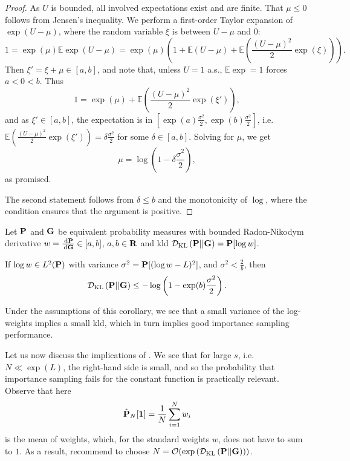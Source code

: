 \begin{proof}
    As $U$ is bounded, all involved expectations exist and are finite. That $\mu \leq 0$ follows from Jensen's inequality. We perform a first-order Taylor expansion of $\exp(U - \mu)$, where the random variable $\xi$ is between $U - \mu$ and $0$:
    $$
    1 = \exp(\mu)\mathbb E \exp (U - \mu) = \exp (\mu) \left( 1 + \mathbb E (U - \mu) + \mathbb E\left(\frac{(U-\mu)^{2}}{2} \exp(\xi)\right) \right).
    $$
    Then $\xi' = \xi + \mu \in [a,b]$, and note that, unless $U = 1$ a.s., $\mathbb E \exp = 1$ forces $a < 0 < b$. 
    Thus
    $$
    1 = \exp(\mu) + \mathbb E\left(\frac{(U-\mu)^{2}}{2} \exp(\xi')\right),
    $$
    and as $\xi' \in [a,b]$, the expectation is in $\left[\exp(a) \frac{\sigma^{2}}{2}, \exp(b) \frac{\sigma^{2}}{2}\right]$, i.e. $\mathbb E\left(\frac{(U-\mu)^{2}}{2} \exp(\xi')\right) = \delta \frac{\sigma^{2}}{2}$ for some $\delta \in [a,b]$. Solving for $\mu$, we get 
    $$
    \mu = \log \left( 1 - \delta \frac{\sigma^{2}}{2} \right),
    $$
    as promised.

    The second statement follows from $\delta \leq b$ and the monotonicity of $\log$, where the condition ensures that the argument is positive.
\end{proof}

\begin{corollary}
    Let $\P$ and $\G$ be equivalent probability measures with bounded Radon-Nikodym derivative $w = \frac{\d\P}{\d\G} \in [a,b]$, $a, b \in \R$ and \acrshort{kld} $\Dkl{\P}{\G} =\P [\log w]$.
    
    If $\log w \in L^{2}(\P)$ with variance $\sigma^{2} = \P [(\log w - L)^2]$, and $\sigma^{2} < \frac{2}{b}$, then 
    $$
    \Dkl{\P}{\G} \leq - \log \left(1 - \exp(b) \frac{\sigma^{2}}{2} \right).
    $$
\end{corollary}
Under the assumptions of this corollary, we see that a small variance of the log-weights implies a small \acrshort{kld}, which in turn implies good importance sampling performance.

Let us now discuss the implications of . We see that for large $s$, i.e. $N \ll \exp(L)$, the right-hand side is small, and so the probability that importance sampling fails for the constant function is practically relevant. Observe that here 
$$
\hat \P_{N} [\mathbf 1 ] = \frac{1}{N} \sum_{i = 1}^N w_{i}
$$
is the mean of weights, which, for the standard weights $w$, does not have to sum to $1$. 
As a result, \citeauthor{Chatterjee2018Sample} recommend to choose $N = \mathcal O( \exp \left( \Dkl{\P}{\G} \right))$. 

